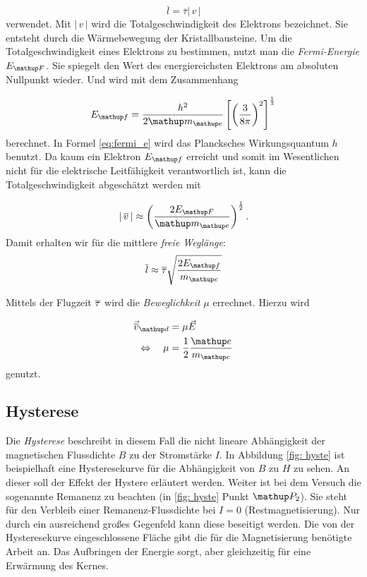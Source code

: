 \begin{equation*}
\label{eq:freie_weg}
\overline{l}=\overline{\tau}\left|\,v\,\right|
\end{equation*}
verwendet.
Mit $\left|\,v\,\right|$ wird die Totalgeschwindigkeit des Elektrons bezeichnet.
Sie entsteht durch die Wärmebewegung der Kristallbausteine.
Um die Totalgeschwindigkeit eines Elektrons zu bestimmen, nutzt
man die \emph{Fermi-Energie} $E\ua{F}$. Sie spiegelt den Wert des energiereichsten Elektrons am absoluten Nullpunkt wieder.
Und wird mit dem Zusammenhang %

\begin{equation}
\label{eq:fermi_e}
E\ua{f}=\frac{h^2}{2\map{m}\ua{e}}\left[\left(\frac{3}{8\pi}\right)^2\right]^{\frac{1}{3}}
\end{equation}
berechnet. In Formel \eqref{eq:fermi_e} wird das Plancksches Wirkungsquantum $h$ benutzt.
Da kaum ein Elektron $E\ua{f}$ erreicht und somit im Wesentlichen nicht
für die elektrische Leitfähigkeit verantwortlich ist, %
kann die Totalgeschwindigkeit abgeschätzt werden mit %

\begin{equation}
\label{eq:total_v}
\left|\,\overline{v}\,\right|\approx\left(\frac{2E\ua{F}}{\map{m}\ua{e}}\right)^{\frac{1}{2}}.
\end{equation}
Damit erhalten wir für die  mittlere \emph{freie Weglänge}:
\begin{equation}
\label{eq:mit_frei_weg}
\overline{l}\approx\overline{\tau}\sqrt{\frac{2E\ua{f}}{m\ua{e}}}
\end{equation}

Mittels der Flugzeit $\overline{\tau}$ wird die \emph{Beweglichkeit} $\mu$ errechnet.
Hierzu wird  %

\begin{align}
\vec{\ov{v}}\ua{d}&=\mu\vec{E} \notag \\
\Leftrightarrow \quad \mu&=\frac{1}{2}\frac{\map{e}}{m\ua{e}} \label{eq:beweg}
\end{align}
genutzt.

\subsection{Hysterese}

Die \emph{Hysterese} beschreibt in diesem Fall die nicht lineare
Abhängigkeit der magnetischen Flussdichte $B$ zu der
Stromstärke $I$.
In Abbildung \ref{fig: hyste} ist beispielhaft eine Hysteresekurve für die Abhängigkeit
von $B$ zu $H$ zu sehen. An dieser soll der Effekt der Hystere erläutert werden.
Weiter ist bei dem Versuch die sogenannte Remanenz zu beachten (in \ref{fig: hyste} Punkt $\map{P}_2$). %
Sie steht für den Verbleib einer Remanenz-Flussdichte bei $I=0$ (Restmagnetisierung). %
Nur durch ein ausreichend großes Gegenfeld kann diese beseitigt werden. %
Die von der Hysteresekurve eingeschlossene Fläche gibt die für die Magnetisierung benötigte
Arbeit an. Das Aufbringen der Energie sorgt, aber gleichzeitig für eine Erwärmung des Kernes. %

